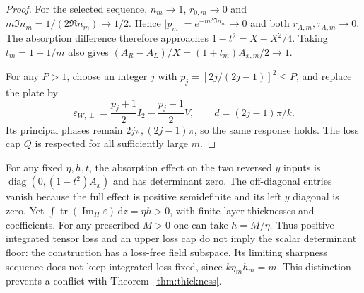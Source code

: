 \documentclass[11pt,a4paper]{article}
\theoremstyle{remark}
\newcommand{\abs}[1]{\lvert #1\rvert}
\newcommand{\dd}{\,\mathrm d}
\newcommand{\tr}{\operatorname{tr}}
\newcommand{\diag}{\operatorname{diag}}
\newcommand{\ImH}{\operatorname{Im}_{H}}
\begin{document}
\begin{proof}
For the selected sequence, $n_m\to1$, $r_{0,m}\to0$ and $m\Im n_m=1/(2\Re n_m)\to1/2$. Hence $\abs{p_m}=e^{-m^2\Im n_m}\to0$ and both $r_{A,m},\tau_{A,m}\to0$. The absorption difference therefore approaches $1-t^2=X-X^2/4$. Taking $t_m=1-1/m$ also gives $(A_R-A_L)/X=(1+t_m)A_{x,m}/2\to1$.

For any $P>1$, choose an integer $j$ with $p_j=[2j/(2j-1)]^2\leq P$, and replace the plate by
\[
 \varepsilon_{W,\perp}=\frac{p_j+1}{2}I_2-\frac{p_j-1}{2}V,\qquad
 d=(2j-1)\pi/k.
\]
Its principal phases remain $2j\pi,(2j-1)\pi$, so the same response holds. The loss cap $Q$ is respected for all sufficiently large $m$.
\end{proof}

For any fixed $\eta,h,t$, the absorption effect on the two reversed $y$ inputs is $\diag(0,(1-t^2)A_x)$ and has determinant zero. The off-diagonal entries vanish because the full effect is positive semidefinite and its left $y$ diagonal is zero. Yet $\int\tr(\ImH\varepsilon)\dd z=\eta h>0$, with finite layer thicknesses and coefficients. For any prescribed $M>0$ one can take $h=M/\eta$. Thus positive integrated tensor loss and an upper loss cap do not imply the scalar determinant floor: the construction has a loss-free field subspace. Its limiting sharpness sequence does not keep integrated loss fixed, since $k\eta_mh_m=m$. This distinction prevents a conflict with Theorem~\ref{thm:thickness}.
\end{document}
